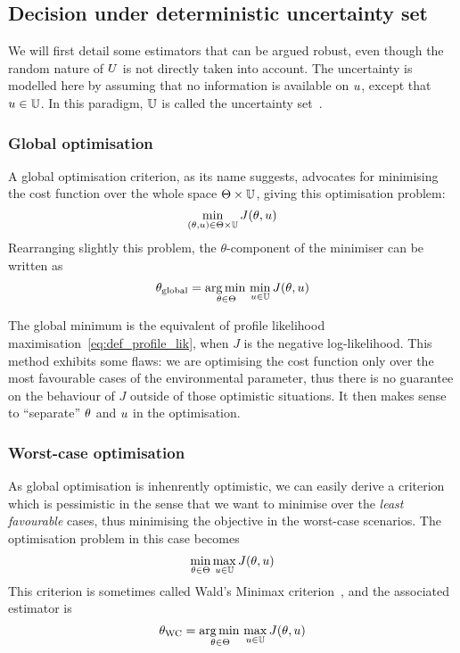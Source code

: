 \documentclass[../../Main_ManuscritThese.tex]{subfiles}
\begin{document}
\subsection{Decision under deterministic uncertainty set}
We will first detail some estimators that can be argued robust, even though the random nature of $U$ is not directly taken into account.
The uncertainty is modelled here by assuming that no information is available on $u$, except that $u \in \mathbb{U}$. In this paradigm, $\mathbb{U}$ is called the uncertainty set~\cite{bertsimas_theory_2010}.

\subsubsection{Global optimisation}
A global optimisation criterion, as its name suggests, advocates for minimising the cost function over the whole space $\Theta \times \mathbb{U}$, giving this optimisation problem:
\begin{equation}
  \min_{(\theta,u) \in \Theta \times \mathbb{U}} J(\theta, u)
\end{equation}
Rearranging slightly this problem, the $\theta$-component of the minimiser can be written as
\begin{equation}
  \label{eq:kkglobal}
  {\theta}_{\mathrm{global}} = \operatorname*{arg\,min \,}_{\theta \in \Theta} \min_{u \in \mathbb{U}} J(\theta, u)
\end{equation}

The global minimum is the equivalent of profile likelihood
maximisation~\cref{eq:def_profile_lik}, when $J$ is the negative
log-likelihood. This method exhibits some flaws: we are optimising the
cost function only over the most favourable cases of the environmental
parameter, thus there is no guarantee on the behaviour of $J$ outside
of those optimistic situations.  It then makes sense to ``separate''
$\theta$ and $u$ in the optimisation.

\subsubsection{Worst-case optimisation}
\label{sec:saddle_point}
As global optimisation is inhenrently optimistic, we can easily derive
a criterion which is pessimistic in the sense that we want to minimise
over the \emph{least favourable} cases, thus minimising the objective
in the worst-case scenarios. The optimisation problem in this case
becomes
\begin{equation}
  \min_{\theta\in\Theta} \max_{u \in \mathbb{U}} J(\theta,u)
\end{equation}
This criterion is sometimes called Wald's Minimax criterion~\cite{wald_statistical_1945}, and the associated estimator is
\begin{equation}
  \label{eq:kkwc}
  {\theta}_{\mathrm{WC}} =  \operatorname*{arg\,min \,}_{\theta \in \Theta} \max_{u \in \mathbb{U}} J(\theta, u)
\end{equation}
\end{document}
